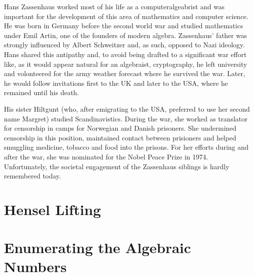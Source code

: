 \documentclass[tikz]{scrreprt}
\begin{document}
Hans Zassenhaus worked most of his life as a computeralgeabrist and
was important for the development of this area of mathematics and
computer science. He was born in Germany before the second world war
and studied mathematics under Emil Artin, one of the founders of
modern algebra. Zassenhaus' father was strongly influenced by
Albert Schweitzer and, as such, opposed to Nazi ideology.
Hans shared this antipathy and, to avoid being drafted to
a significant war effort like, as it would appear natural
for an algebraist, cryptography, he left university and volonteered for 
the army weather forecast where he survived the war.
Later, he would follow invitations first to the UK and later to the USA,
where he remained until his death.

His sister Hiltgunt (who, after emigrating to the USA,
preferred to use her second name Margret) studied Scandinavistics.
During the war, she worked as translator for censorship in camps
for Norwegian and Danish prisoners. She undermined censorship in
this position, maintained contact between 
prisioners and helped smuggling medicine, tobacco and food
into the prisons. For her efforts during and after the war,
she was nominated for the Nobel Peace Prize in 1974. 
Unfortunately, the societal engagement of the Zassenhaus siblings
is hardly remembered today.


\section{Hensel Lifting}
\section{Enumerating the Algebraic Numbers}
\end{document}
